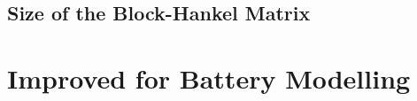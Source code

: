 \subsection{Size of the Block-Hankel Matrix\label{subsec:Size-of-the}}


\section{Improved  for Battery Modelling} \label{sec:Efficient-Computation-of}

